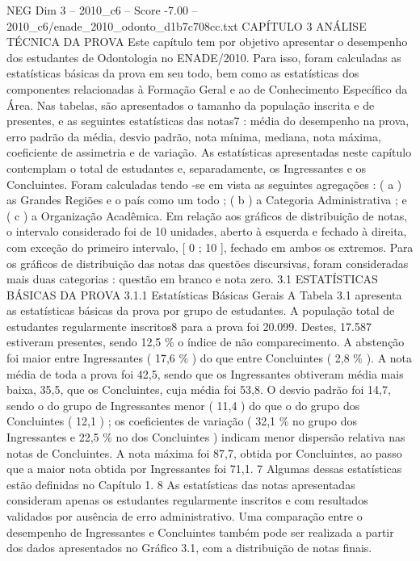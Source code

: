 \begin{textsample}{NEG Dim 3 – 2010\_c6 – Score -7.00 – 2010\_c6/enade\_2010\_odonto\_d1b7c708cc.txt}  \label{ex:f3_neg_013}
CAPÍTULO 3 ANÁLISE TÉCNICA DA PROVA Este capítulo tem por objetivo apresentar o desempenho dos estudantes de Odontologia no ENADE/2010.
Para isso, foram calculadas as estatísticas básicas da prova em seu todo, bem como as estatísticas dos componentes relacionadas à Formação Geral e ao de Conhecimento Específico da Área.
Nas tabelas, são apresentados o tamanho da população inscrita e de presentes, e as seguintes estatísticas das notas7 : média do desempenho na prova, erro padrão da média, desvio padrão, nota mínima, mediana, nota máxima, coeficiente de assimetria e de variação.
As estatísticas apresentadas neste capítulo contemplam o total de estudantes e, separadamente, os Ingressantes e os Concluintes.
Foram calculadas tendo -se em vista as seguintes agregações : ( a ) as Grandes Regiões e o país como um todo ; ( b ) a Categoria Administrativa ; e ( c ) a Organização Acadêmica.
Em relação aos gráficos de distribuição de notas, o intervalo considerado foi de 10 unidades, aberto à esquerda e fechado à direita, com exceção do primeiro intervalo, [ 0 ; 10 ], fechado em ambos os extremos.
Para os gráficos de distribuição das notas das questões discursivas, foram consideradas mais duas categorias : questão em branco e nota zero. 3.1 ESTATÍSTICAS BÁSICAS DA PROVA 3.1.1 Estatísticas Básicas Gerais A Tabela 3.1 apresenta as estatísticas básicas da prova por grupo de estudantes.
A população total de estudantes regularmente inscritos8 para a prova foi 20.099.
Destes, 17.587 estiveram presentes, sendo 12,5 \% o índice de não comparecimento.
A abstenção foi maior entre Ingressantes ( 17,6 \% ) do que entre Concluintes ( 2,8 \% ).
A nota média de toda a prova foi 42,5, sendo que os Ingressantes obtiveram média mais baixa, 35,5, que os Concluintes, cuja média foi 53,8.
O desvio padrão foi 14,7, sendo o do grupo de Ingressantes menor ( 11,4 ) do que o do grupo dos Concluintes ( 12,1 ) ; os coeficientes de variação ( 32,1 \% no grupo dos Ingressantes e 22,5 \% no dos Concluintes ) indicam menor dispersão relativa nas notas de Concluintes.
A nota máxima foi 87,7, obtida por Concluintes, ao passo que a maior nota obtida por Ingressantes foi 71,1. 7 Algumas dessas estatísticas estão definidas no Capítulo 1. 8 As estatísticas das notas apresentadas consideram apenas os estudantes regularmente inscritos e com resultados validados por ausência de erro administrativo.
Uma comparação entre o desempenho de Ingressantes e Concluintes também pode ser realizada a partir dos dados apresentados no Gráfico 3.1, com a distribuição de notas finais.

\end{textsample}
